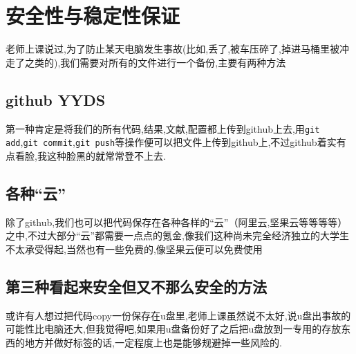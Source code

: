 \documentclass{ctexart}
\begin{document}
\section{安全性与稳定性保证}
老师上课说过,为了防止某天电脑发生事故(比如,丢了,被车压碎了,掉进马桶里被冲走了之类的),我们需要对所有的文件进行一个备份,主要有两种方法
\subsection{github YYDS}
第一种肯定是将我们的所有代码,结果,文献,配置都上传到github上去,用\verb|git add|,\verb|git commit|,\verb|git push|等操作便可以把文件上传到github上,不过github着实有点看脸,我这种脸黑的就常常登不上去.
\subsection{各种“云”}
除了github,我们也可以把代码保存在各种各样的“云”（阿里云,坚果云等等等等）之中,不过大部分“云”都需要一点点的氪金,像我们这种尚未完全经济独立的大学生不太承受得起,当然也有一些免费的,像坚果云便可以免费使用
\subsection{第三种看起来安全但又不那么安全的方法}
或许有人想过把代码copy一份保存在u盘里,老师上课虽然说不太好,说u盘出事故的可能性比电脑还大,但我觉得吧,如果用u盘备份好了之后把u盘放到一专用的存放东西的地方并做好标签的话,一定程度上也是能够规避掉一些风险的.



\end{document}
